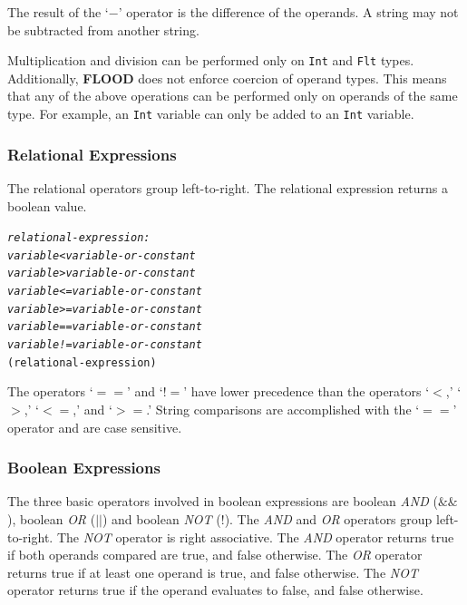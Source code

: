 \documentclass[12pt]{report}
\begin{document}
The result of the `$-$' operator is the difference of the operands. A string may not be subtracted from another string.

Multiplication and division can be performed only on \texttt{Int} and \texttt{Flt} types. Additionally, \textbf{FLOOD} does not enforce coercion of operand types. This means that any of the above operations can be performed only on operands of the same type. For example, an \texttt{Int} variable can only be added to an \texttt{Int} variable.

\subsubsection{Relational Expressions}

The relational operators group left-to-right. The relational expression returns a boolean value.

\begin{alltt}\begin{singlespace}
         \textit{relational-expression:}
            \textit{variable < variable-or-constant}
            \textit{variable > variable-or-constant}
            \textit{variable <= variable-or-constant}
            \textit{variable >= variable-or-constant}
            \textit{variable == variable-or-constant}
            \textit{variable != variable-or-constant}
            (relational-expression)\end{singlespace}
\end{alltt}

The operators `$==$' and `$!$$=$' have lower precedence than the operators `$<$,' `$>$,' `$<=$,' and `$>=$.' String comparisons are accomplished with the `$==$' operator and are case sensitive.

\subsubsection{Boolean Expressions}

The three basic operators involved in boolean expressions are boolean \textit{AND} ($\&\&$), boolean \textit{OR} ($||$) and boolean \textit{NOT} ($!$). The \textit{AND} and \textit{OR} operators group left-to-right. The \textit{NOT} operator is right associative. The \textit{AND} operator returns true if both operands compared are true, and false otherwise. The \textit{OR} operator returns true if at least one operand is true, and false otherwise. The \textit{NOT} operator returns true if the operand evaluates to false, and false otherwise.
\end{document}
